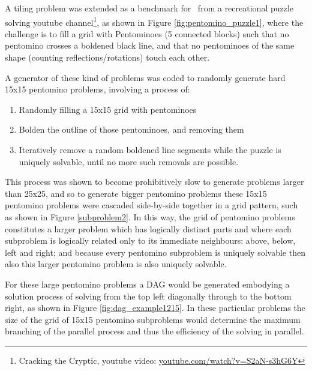 \documentclass[
10pt, %
a4paper, %
oneside, %
headinclude,footinclude, %
BCOR5mm, %
]{scrartcl}
\begin{document}
A tiling problem was extended as a benchmark for \dagster\ from a recreational puzzle solving youtube channel\footnote{Cracking the Cryptic, youtube video: \url{youtube.com/watch?v=S2aN-s3hG6Y}}, as shown in Figure \ref{fig:pentomino_puzzle1}, where the challenge is to fill a grid with Pentominoes (5 connected blocks) such that no pentomino crosses a boldened black line, and that no pentominoes of the same shape (counting reflections/rotations) touch each other.



A generator of these kind of problems was coded to randomly generate hard 15x15 pentomino problems, involving a process of:
\begin{enumerate}
\item	Randomly filling a 15x15 grid with pentominoes
\item	Bolden the outline of those pentominoes, and removing them
\item	Iteratively remove a random boldened line segments while the puzzle is uniquely solvable, until no more such removals are possible.
\end{enumerate}

This process was shown to become prohibitively slow to generate problems larger than 25x25, and so to generate bigger pentomino problems these 15x15 pentomino problems were cascaded side-by-side together in a grid pattern, such as shown in Figure \ref{subproblem2}.
In this way, the grid of pentomino problems constitutes a larger problem which has logically distinct parts and where each subproblem is logically related only to its immediate neighbours: above, below, left and right; and because every pentomino subproblem is uniquely solvable then also this larger pentomino problem is also uniquely solvable.

For these large pentomino problems a DAG would be generated embodying a solution process of solving from the top left diagonally through to the bottom right, as shown in Figure \ref{fig:dag_example1215}.
In these particular problems the size of the grid of 15x15 pentomino subproblems would determine the maximum branching of the parallel process and thus the efficiency of the solving in parallel.


\end{document}
